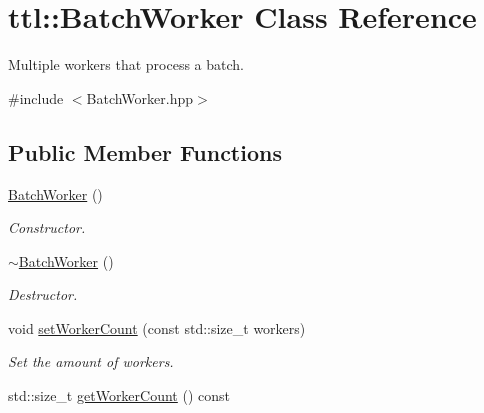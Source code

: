 \hypertarget{classttl_1_1_batch_worker}{\section{ttl\-:\-:Batch\-Worker Class Reference}
\label{classttl_1_1_batch_worker}
}


Multiple workers that process a batch.  




{\ttfamily \#include $<$Batch\-Worker.\-hpp$>$}

\subsection*{Public Member Functions}
\begin{DoxyCompactItemize}
\item 
\hypertarget{classttl_1_1_batch_worker_ab8e696acfc7a56ca1cbe7079e41e7561}{\hyperlink{classttl_1_1_batch_worker_ab8e696acfc7a56ca1cbe7079e41e7561}{Batch\-Worker} ()}\label{classttl_1_1_batch_worker_ab8e696acfc7a56ca1cbe7079e41e7561}

\begin{DoxyCompactList}\small\item\em Constructor. \end{DoxyCompactList}\item 
\hypertarget{classttl_1_1_batch_worker_a4083ecca62c3a8805501c2eb1e7af090}{\hyperlink{classttl_1_1_batch_worker_a4083ecca62c3a8805501c2eb1e7af090}{$\sim$\-Batch\-Worker} ()}\label{classttl_1_1_batch_worker_a4083ecca62c3a8805501c2eb1e7af090}

\begin{DoxyCompactList}\small\item\em Destructor. \end{DoxyCompactList}\item 
\hypertarget{classttl_1_1_batch_worker_ab650b49895048f890a84e4a3a4240b70}{void \hyperlink{classttl_1_1_batch_worker_ab650b49895048f890a84e4a3a4240b70}{set\-Worker\-Count} (const std\-::size\-\_\-t workers)}\label{classttl_1_1_batch_worker_ab650b49895048f890a84e4a3a4240b70}

\begin{DoxyCompactList}\small\item\em Set the amount of workers. \end{DoxyCompactList}\item 
\hypertarget{classttl_1_1_batch_worker_afb6f8ca6a57d946787e3d38db1791406}{std\-::size\-\_\-t \hyperlink{classttl_1_1_batch_worker_afb6f8ca6a57d946787e3d38db1791406}{get\-Worker\-Count} () const }\label{classttl_1_1_batch_worker_afb6f8ca6a57d946787e3d38db1791406}


\end{DoxyCompactItemize}
